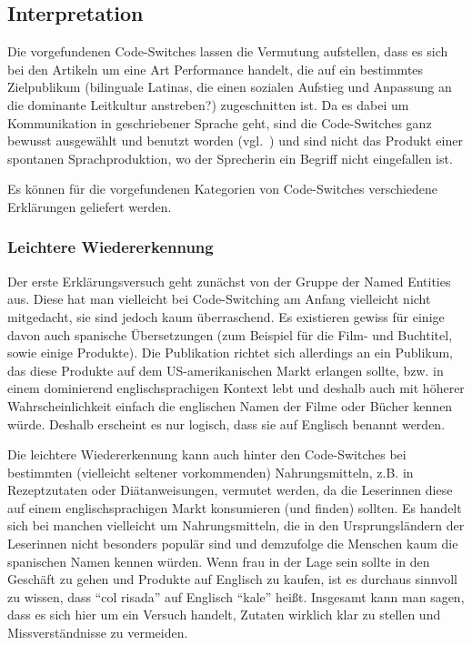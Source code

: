 \subsection{Interpretation}
\label{chap:results-analysis}

Die vorgefundenen Code-Switches lassen die Vermutung aufstellen, dass es sich bei den Artikeln um eine Art Performance handelt, die auf ein bestimmtes Zielpublikum (bilinguale Latinas, die einen sozialen Aufstieg und Anpassung an die dominante Leitkultur anstreben?) zugeschnitten ist.
Da es dabei um Kommunikation in geschriebener Sprache geht, sind die Code-Switches ganz bewusst ausgewählt und benutzt worden (vgl.~\cite{Mahootian05}) und sind nicht das Produkt einer spontanen Sprachproduktion, wo der Sprecherin ein Begriff nicht eingefallen ist.

Es können für die vorgefundenen Kategorien von Code-Switches verschiedene Erklärungen geliefert werden.

\subsubsection{Leichtere Wiedererkennung}
Der erste Erklärungsversuch geht zunächst von der Gruppe der Named Entities aus.
Diese hat man vielleicht bei Code-Switching am Anfang vielleicht nicht mitgedacht, sie sind jedoch kaum überraschend.
Es existieren gewiss für einige davon auch spanische Übersetzungen (zum Beispiel für die Film- und Buchtitel, sowie einige Produkte).
Die Publikation richtet sich allerdings an ein Publikum, das diese Produkte auf dem US-amerikanischen Markt erlangen sollte, bzw. in einem dominierend englischsprachigen Kontext lebt und deshalb auch mit höherer Wahrscheinlichkeit einfach die englischen Namen der Filme oder Bücher kennen würde.
Deshalb erscheint es nur logisch, dass sie auf Englisch benannt werden.

Die leichtere Wiedererkennung kann auch hinter den Code-Switches bei bestimmten (vielleicht seltener vorkommenden) Nahrungsmitteln, z.B. in Rezeptzutaten oder Diätanweisungen, vermutet werden, da die Leserinnen diese auf einem englischsprachigen Markt konsumieren (und finden) sollten.
Es handelt sich bei manchen vielleicht um Nahrungsmitteln, die in den Ursprungsländern der Leserinnen nicht besonders populär sind und demzufolge die Menschen kaum die spanischen Namen kennen würden.
Wenn frau in der Lage sein sollte in den Geschäft zu gehen und Produkte auf Englisch zu kaufen, ist es durchaus sinnvoll zu wissen, dass ``col risada'' auf Englisch ``kale'' heißt.
Insgesamt kann man sagen, dass es sich hier um ein Versuch handelt, Zutaten wirklich klar zu stellen und Missverständnisse zu vermeiden.

